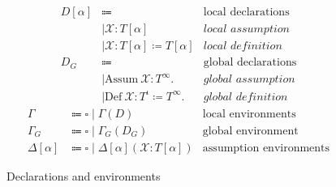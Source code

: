 \begin{figure}
\centering
\begin{align*}
D[\alpha] &\Coloneqq                                            &\text{local declarations} \\
    &\mid \mathcal{X}: T[\alpha]                                &\textit{local assumption} \\
    &\mid \mathcal{X}: T[\alpha] \coloneqq T[\alpha]            &\textit{local definition} \\
D_G &\Coloneqq                                                  &\text{global declarations} \\
    &\mid \text{Assum} \ \mathcal{X}: T^\infty.                 &\textit{global assumption} \\
    &\mid \text{Def} \ \mathcal{X}: T^\iota \coloneqq T^\infty. &\textit{global definition}
\end{align*}
\begin{align*}
\Gamma          &\Coloneqq \square \mid \Gamma (D)              &\text{local environments} \\
\Gamma_G        &\Coloneqq \square \mid \Gamma_G (D_G)          &\text{global environment} \\
\Delta[\alpha]  &\Coloneqq \square \mid \Delta[\alpha] (\mathcal{X}: T[\alpha]) &\text{assumption environments}
\end{align*}
\caption{Declarations and environments}
\label{fig:contexts}
\end{figure}